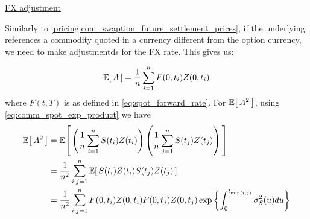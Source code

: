 \underline{FX adjustment}

Similarly to \ref{pricing:com_swaption_future_settlement_prices}, if the underlying references a commodity quoted in a currency different from the option currency, we need to make adjustmentds for the FX rate. This gives us:

\begin{equation}
\Ex{A} = \frac{1}{n} \sum_{i=1}^{n} F(0, t_i) Z(0, t_i)
\end{equation}
where $F(t, T)$ is as defined in \eqref{eq:spot_forward_rate}. For $\Ex{A^2}$, using \eqref{eq:comm_spot_exp_product} we have
\begin{equation}
\begin{split}
\Ex{A^2} &= \Ex{ \left( \frac{1}{n} \sum_{i=1}^{n} S(t_{i}) Z(t_i) \right) \left( \frac{1}{n} \sum_{j=1}^{n} S(t_{j}) Z(t_j) \right) } \\
         &= \frac{1}{n^2} \sum_{i,j=1}^{n} \Ex{ S(t_{i}) Z(t_i) S(t_{j}) Z(t_j) } \\
         &= \frac{1}{n^2} \sum_{i,j=1}^{n} F(0, t_i) Z(0, t_i) F(0, t_j) Z(0, t_j) \exp \left\{ \int_{0}^{t_{\min(i,j)}} \sigma^2_S(u) du \right\}
\end{split}
\end{equation}